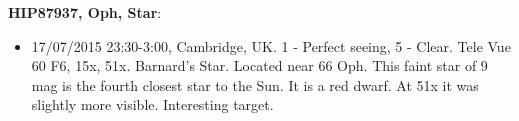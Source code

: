 {\bf HIP87937, Oph, Star}:
\begin{itemize}
\item 17/07/2015 23:30-3:00, Cambridge, UK. 1 - Perfect seeing, 5 - Clear. Tele Vue 60 F6, 15x, 51x. Barnard's Star. Located near 66 Oph. This faint star of 9 mag is the fourth closest star to the Sun. It is a red dwarf. At 51x it was slightly more visible. Interesting target.
\end{itemize}
